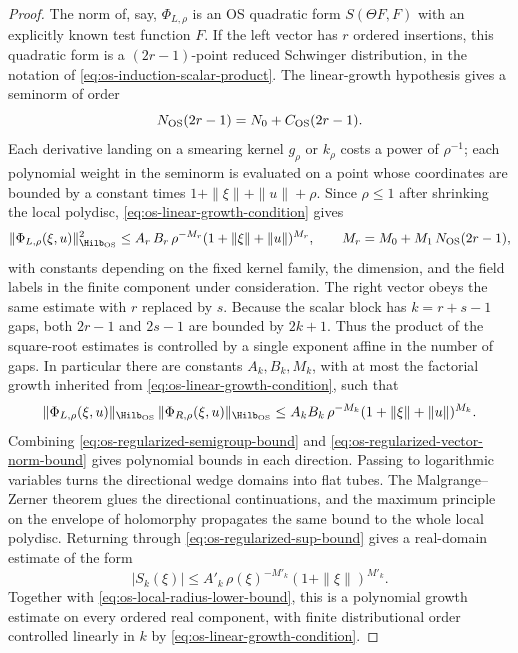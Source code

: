 \begin{proof}
The norm of, say, \(\Phi_{L,\rho}\) is an OS quadratic form
\(S(\Theta F,F)\) with an explicitly known test function \(F\).  If the
left vector has \(r\) ordered insertions, this quadratic form is a
\((2r-1)\)-point reduced Schwinger distribution, in the notation of
\eqref{eq:os-induction-scalar-product}.  The linear-growth hypothesis gives
a seminorm of order
\begin{equation}
  N_{\rm OS}(2r-1)
  =
  N_0+C_{\rm OS}(2r-1).
  \label{eq:os-quadratic-form-seminorm-order}
\end{equation}
Each derivative landing on a smearing kernel \(g_\rho\) or \(k_\rho\) costs a
power of \(\rho^{-1}\); each polynomial weight in the seminorm is evaluated
on a point whose coordinates are bounded by a constant times
\(1+\|\xi\|+\|u\|+\rho\).  Since \(\rho\le1\) after shrinking the local
polydisc, \eqref{eq:os-linear-growth-condition} gives
\begin{equation}
  \|\Phi_{L,\rho}(\xi,u)\|_{\Hilb_{\rm OS}}^2
  \le
  A_{r}\,B_r\,
  \rho^{-M_r}
  (1+\|\xi\|+\|u\|)^{M_r},
  \qquad
  M_r=M_0+M_1\,N_{\rm OS}(2r-1),
  \label{eq:os-left-vector-norm-bound}
\end{equation}
with constants depending on the fixed kernel family, the dimension, and the
field labels in the finite component under consideration.  The right vector
obeys the same estimate with \(r\) replaced by \(s\).  Because the scalar
block has \(k=r+s-1\) gaps, both \(2r-1\) and \(2s-1\) are bounded by
\(2k+1\).  Thus the product of the square-root estimates is controlled by a
single exponent affine in the number of gaps.  In particular there are
constants \(A_k,B_k,M_k\), with at most the factorial growth inherited from
\eqref{eq:os-linear-growth-condition}, such that
\begin{equation}
  \|\Phi_{L,\rho}(\xi,u)\|_{\Hilb_{\rm OS}}\,
  \|\Phi_{R,\rho}(\xi,u)\|_{\Hilb_{\rm OS}}
  \le
  A_kB_k\,\rho^{-M_k}(1+\|\xi\|+\|u\|)^{M_k}.
  \label{eq:os-regularized-vector-norm-bound}
\end{equation}
Combining
\eqref{eq:os-regularized-semigroup-bound} and
\eqref{eq:os-regularized-vector-norm-bound} gives polynomial bounds in each
direction.  Passing to logarithmic variables turns the directional wedge
domains into flat tubes.  The Malgrange--Zerner theorem glues the directional
continuations, and the maximum principle on the envelope of holomorphy
propagates the same bound to the whole local polydisc.  Returning through
\eqref{eq:os-regularized-sup-bound} gives a real-domain estimate of the form
\begin{equation}
  |S_k(\xi)|
  \le
  A'_k\,\rho(\xi)^{-M'_k}(1+\|\xi\|)^{M'_k}.
  \label{eq:os-real-domain-tempered-estimate}
\end{equation}
Together with \eqref{eq:os-local-radius-lower-bound}, this is a polynomial
growth estimate on every ordered real component, with finite distributional
order controlled linearly in \(k\) by
\eqref{eq:os-linear-growth-condition}.


\end{proof}
